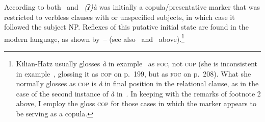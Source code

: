 \documentclass[output=paper]{LSP/langsci}
\begin{document}

According to both~ and~ \textit{(ʔ)à} was initially a copula/presentative marker that was restricted to verbless clauses with  or unspecified subjects, in which case it followed the subject NP. Reflexes of this putative initial state are found in the modern language, as shown by~– (see also~ and~ above).\footnote{Kilian-Hatz usually glosses \textit{à} in example~ as \textsc{foc}, not \textsc{cop} (she is inconsistent in example~, glossing it as \textsc{cop} on p.\, 199, but as \textsc{foc} on p.\, 208). What she normally glosses as \textsc{cop} is \textit{à} in final position in the relational clause, as in the case of the second instance of \textit{à} in~. In keeping with the remarks of footnote 2 above, I employ the gloss \textsc{cop} for those cases in which the marker appears to be serving as a copula.}
\end{document}
